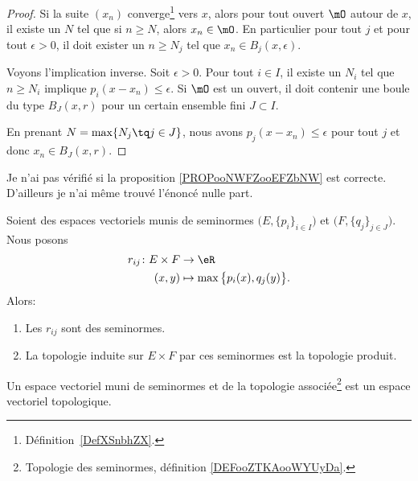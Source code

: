 \begin{proof}
    Si la suite \( (x_n)\) converge\footnote{Définition~\ref{DefXSnbhZX}.} vers \( x\), alors pour tout ouvert \( \mO\) autour de \( x\), il existe un \( N\) tel que si \( n\geq N\), alors \( x_n\in\mO\). En particulier pour tout \( j\) et pour tout \( \epsilon>0\), il doit exister un \( n\geq N_j\) tel que \( x_n\in B_j(x,\epsilon)\).

    Voyons l'implication inverse. Soit \( \epsilon>0\). Pour tout \( i\in I\), il existe un \( N_i\) tel que \( n\geq N_i\) implique \( p_i(x-x_n)\leq \epsilon\). Si \( \mO\) est un ouvert, il doit contenir une boule du type \( B_J(x,r)\) pour un certain ensemble fini \( J\subset I\).

    En prenant \( N=\max\{ N_j\tq j\in J \}\), nous avons \( p_j(x-x_n)\leq \epsilon\) pour tout \( j\) et donc \( x_n\in B_J(x,r)\).
\end{proof} 

\begin{probleme}        %
    Je n'ai pas vérifié si la proposition \ref{PROPooNWFZooEFZbNW} est correcte. D'ailleurs je n'ai même trouvé l'énoncé nulle part.
\end{probleme}

\begin{proposition}      \label{PROPooNWFZooEFZbNW}
    Soient des espaces vectoriels munis de seminormes \( \big( E,\{ p_i \}_{i\in I} \big) \) et \( \big( F,\{ q_j \}_{j\in J} \big)\). Nous posons
    \begin{equation}
        \begin{aligned}
            r_{ij}\colon E\times F&\to \eR \\
            (x,y)&\mapsto \max\big\{ p_i(x), q_j(y) \big\}. 
        \end{aligned}
    \end{equation}
    Alors:
    \begin{enumerate}
        \item
            Les \( r_{ij}\) sont des seminormes.
        \item
            La topologie induite sur \( E\times F\) par ces seminormes est la topologie produit.
    \end{enumerate}
\end{proposition}

\begin{proposition}       \label{PROPooGXGQooLRTwvH}
    Un espace vectoriel muni de seminormes et de la topologie associée\footnote{Topologie des seminormes, définition \ref{DEFooZTKAooWYUyDa}.} est un espace vectoriel topologique.
\end{proposition}

